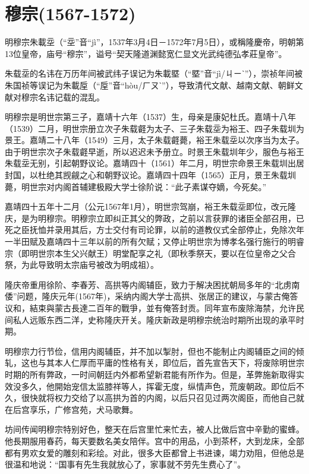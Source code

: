 
\section{穆宗\tiny(1567-1572)}

明穆宗朱載坖（“坖”音“jì”，1537年3月4日－1572年7月5日），或稱隆慶帝，明朝第13位皇帝，庙号“穆宗”，谥号“契天隆道渊懿宽仁显文光武纯德弘孝莊皇帝”。

朱载坖的名讳在万历年间被武纬子误记为朱載塈（“塈”音“jì/ㄐㄧˋ”），崇祯年间被朱国祯等误记为朱載垕（“垕”音“hòu/ㄏㄡˋ”），导致清代文献、越南文献、朝鲜文献对穆宗名讳记载的混乱。

明穆宗是明世宗第三子，嘉靖十六年（1537）生，母亲是康妃杜氏。嘉靖十八年（1539）二月，明世宗册立次子朱载壡为太子、三子朱载坖为裕王、四子朱载圳为景王。嘉靖二十八年（1549）三月，太子朱载壡薨，裕王朱载坖以次序当为太子。由于明世宗次子朱载壡早逝，所以迟迟未予册立。时景王朱载圳年少，服色与裕王朱载坖无别，引起朝野议论。嘉靖四十（1561）年二月，明世宗命景王朱载圳出居封国，以杜绝其觊觎之心和朝野议论。嘉靖四十四年（1565）正月，景王朱载圳薨，明世宗对内阁首辅建极殿大学士徐阶说：“此子素谋夺嫡，今死矣。”

嘉靖四十五年十二月（公元1567年1月），明世宗驾崩，裕王朱载坖即位，改元隆庆，是为明穆宗。明穆宗立即纠正其父的弊政，之前以言获罪的诸臣全部召用，已死之臣抚恤并录用其后，方士交付有司论罪，以前的道教仪式全部停止，免除次年一半田赋及嘉靖四十三年以前的所有欠赋；又停止明世宗为博孝名强行施行的明睿宗（即明世宗本生父兴献王）明堂配享之礼（即秋季祭天，要以在位皇帝之父合祭，为此导致明太宗庙号被改为明成祖）。

隆庆帝重用徐阶、李春芳、高拱等内阁辅臣，致力于解决困扰朝局多年的“北虏南倭”问题，隆庆元年(1567年)，采纳内阁大学士高拱、张居正的建议，与蒙古俺答议和，結束與蒙古長達二百年的戰爭，並有俺答封贡。同年宣布废除海禁，允许民间私人远贩东西二洋，史称隆庆开关。隆庆新政是明穆宗统治时期所出现的承平时期。

明穆宗力行节俭，信用内阁辅臣，并不加以掣肘，但也不能制止内阁辅臣之间的倾轧，这也与其本人仁厚而平庸的性格有关，即位后，首先宣告天下，将废除明世宗时期的所有弊政，一时间朝廷内外都希望新君能有所作为。但是，革弊施新取得实效没多久，他開始宠信太监膝祥等人，挥霍无度，纵情声色，荒废朝政。即位后不久，很快就将权力交给了以高拱为首的内阁，以后只召见过两次阁臣，而他自己就在后宫享乐，广修宫苑，犬马歌舞。

坊间传闻明穆宗特别好色，整天在后宫里忙来忙去，被人比做后宫中辛勤的蜜蜂。他長期服用春药，每天要数名美女陪伴。宫中的用品，小到茶杯，大到龙床，全部都有男欢女爱的雕刻和彩绘。对此，很多大臣都曾上书进谏，竭力劝阻，但他总是很温和地说：“国事有先生我就放心了，家事就不劳先生费心了”。

